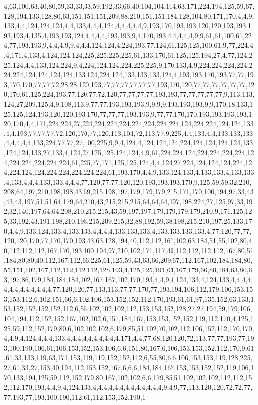 4,63,100,63,40,80,59,33,33,33,59,192,33,66,40,104,104,104,63,171,224,194,125,59,67,128,194,133,128,80,63,151,151,151,209,88,210,151,151,184,128,104,80,171,170,4,4,9,133,4,4,124,124,124,4,4,133,4,4,4,124,4,4,4,4,4,9,193,170,193,193,120,120,193,193,193,193,4,135,4,193,193,124,4,4,4,4,193,193,9,4,170,193,4,4,4,4,4,9,9,61,61,100,61,224,77,193,193,9,4,4,4,9,9,4,4,4,124,124,4,224,193,77,124,61,125,125,100,61,9,77,224,4,4,171,4,133,4,124,124,124,225,225,225,225,61,133,170,61,125,125,194,27,4,77,124,225,124,4,4,133,124,224,9,4,224,124,124,224,225,225,9,170,133,4,9,224,224,224,224,224,224,124,124,124,124,133,124,224,124,133,133,133,124,4,193,193,170,193,77,77,193,170,170,77,77,72,28,28,120,193,77,77,77,77,77,77,193,170,120,77,77,77,77,77,77,120,170,61,125,224,193,77,120,77,72,120,77,77,77,77,193,193,77,77,77,77,77,9,113,113,124,27,209,125,4,9,108,113,9,77,77,193,193,193,9,9,9,9,193,193,193,9,9,170,18,133,125,125,124,193,120,120,193,170,77,77,77,193,193,9,77,77,170,170,193,193,193,193,120,170,4,4,171,224,224,27,224,224,224,224,224,224,224,224,124,224,224,124,124,133,4,4,193,77,77,77,72,120,170,77,120,113,104,72,113,77,9,225,4,4,133,4,4,133,133,133,4,4,4,4,4,133,224,77,77,27,100,225,9,9,4,124,4,124,124,124,224,124,124,124,124,133,124,124,133,27,133,4,124,27,125,125,124,124,4,9,61,224,224,124,224,224,224,224,124,224,224,224,224,224,61,225,77,171,125,125,124,4,4,124,27,224,124,124,124,224,124,224,124,124,224,224,224,224,224,61,193,170,4,4,9,133,124,133,4,133,133,4,133,133,4,133,4,4,4,133,133,4,4,4,77,120,77,77,120,120,193,193,193,170,9,125,59,59,32,210,208,64,197,210,198,198,43,59,215,198,197,179,179,179,215,171,170,100,194,97,33,43,43,43,197,51,51,64,179,64,210,43,215,215,215,64,64,64,197,198,224,27,125,97,33,192,32,140,197,64,64,208,210,215,215,43,59,197,197,179,179,179,179,210,9,171,125,125,33,192,43,191,198,210,198,215,209,215,32,88,192,59,38,198,215,210,197,25,133,170,4,4,9,133,124,133,4,133,133,4,4,4,4,133,133,133,4,133,133,133,133,4,77,120,77,77,120,120,170,77,170,170,193,43,63,128,194,40,112,112,167,102,63,184,51,55,102,80,40,112,112,112,167,170,193,100,194,97,210,102,171,117,40,112,112,112,112,167,80,51,184,80,80,40,112,167,112,66,225,61,125,59,43,63,66,209,67,112,167,102,184,184,80,55,151,102,167,112,112,112,112,128,193,4,125,125,191,63,167,179,66,80,184,63,80,63,197,86,179,184,184,184,102,167,167,102,170,193,4,4,9,4,124,133,4,124,133,4,4,4,4,4,4,4,4,4,4,4,4,4,77,120,120,77,113,113,77,77,170,77,193,194,106,112,179,106,153,153,153,112,6,102,151,66,6,102,106,153,152,152,112,170,193,61,61,97,135,152,63,133,153,152,152,152,152,112,6,55,102,102,102,112,153,153,152,128,27,27,194,59,179,106,104,194,112,152,152,167,102,102,6,151,184,167,153,153,152,152,119,112,170,4,125,125,59,112,152,179,80,6,102,102,102,6,179,85,51,102,70,102,112,106,152,112,170,170,4,4,9,4,124,4,4,4,133,4,4,4,4,4,4,4,4,4,4,171,4,4,77,68,120,120,72,113,77,77,193,77,193,100,190,106,61,106,153,152,153,106,6,6,151,80,167,6,106,153,153,152,112,170,9,61,61,33,133,119,63,171,153,119,119,152,152,112,6,55,80,6,6,106,153,153,119,128,225,27,61,33,27,153,40,194,112,153,152,167,6,6,6,184,184,167,153,153,152,152,119,106,170,133,194,125,59,112,152,179,80,167,102,102,6,6,179,85,51,102,102,102,112,112,152,112,170,193,4,4,9,4,124,133,4,4,4,4,4,4,4,4,4,4,4,4,4,9,4,9,77,113,120,120,72,72,77,77,193,77,193,100,190,112,61,112,153,152,190,1